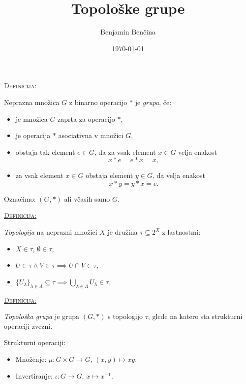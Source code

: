 \documentclass[a4paper, 12pt]{beamer}
\title{Topološke grupe}
\author{Benjamin Benčina}
\institute[FMF]{Fakulteta za matematiko in fiziko}
\date{\today}
\newenvironment{matematika}[1]{
\textcolor{bostonuniversityred}{\underline{\textsc{#1:}}}
}{
}
\begin{document}



\titlepage

\begin{frame}
\begin{matematika}{Definicija}
Neprazna množica $G$ z binarno operacijo $*$ je \emph{grupa}, če:
\begin{itemize}[label=]
\item je množica $G$ zaprta za operacijo $*$,
\item je operacija $*$ asociativna v množici $G$,
\item obstaja tak element $e \in G$, da za vsak element $x \in G$ velja enakost 
\[ x*e = e*x = x, \]
\item za vsak element $x \in G$ obstaja element $y \in G$, da velja enakost
\[ x*y = y*x = e. \]
\end{itemize}
Označimo: $(G, *)$ ali včasih samo $G$.
\end{matematika}
\end{frame}

\begin{frame}
\begin{matematika}{Definicija}
\emph{Topologija} na neprazni množici $X$ je družina $\tau \subseteq 2^{X}$ z lastnostmi:
\begin{itemize}[label=]
\item $X \in \tau$, $\emptyset \in \tau$,
\item $U \in \tau \wedge V \in \tau \implies U \cap V \in \tau$,
\item $\lbrace U_{\lambda} \rbrace_{\lambda \in \Lambda} \subseteq \tau \implies \bigcup\limits_{\lambda \in \Lambda}^{} U_{\lambda} \in \tau$.
\end{itemize}
\end{matematika}
\end{frame}

\begin{frame}
\begin{matematika}{Definicija}
\emph{Topološka grupa} je grupa $(G, *)$ s topologijo $\tau$, glede na katero sta strukturni operaciji zvezni.
\end{matematika}
\newline
\newline
Strukturni operaciji:
\begin{itemize}[label=]
\item Množenje: $\mu : G \times G \to G$, $(x, y) \mapsto xy$.
\item Invertiranje: $\iota : G \to G$, $x \mapsto x^{-1}$.
\end{itemize}

\end{frame}
\end{document}

